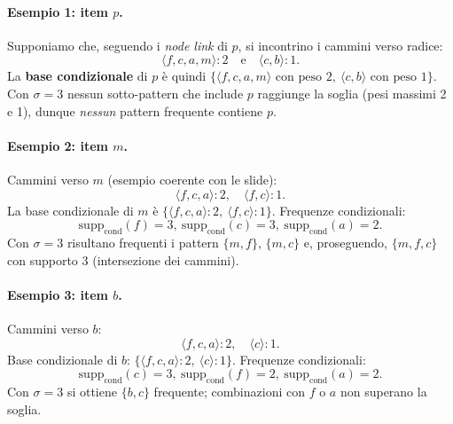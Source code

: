 \paragraph{Esempio 1: item $p$.}
Supponiamo che, seguendo i \emph{node link} di $p$, si incontrino i cammini verso radice:
\[
\langle f,c,a,m\rangle:2 \quad \text{e} \quad \langle c,b\rangle:1.
\]
La \textbf{base condizionale} di $p$ \`e quindi $\{\langle f,c,a,m\rangle \text{ con peso } 2,\ \langle c,b\rangle \text{ con peso } 1\}$. Con $\sigma=3$ nessun sotto-pattern che include $p$ raggiunge la soglia (pesi massimi 2 e 1), dunque \emph{nessun} pattern frequente contiene $p$.

\paragraph{Esempio 2: item $m$.}
Cammini verso $m$ (esempio coerente con le slide):
\[
\langle f,c,a\rangle:2,\quad \langle f,c\rangle:1.
\]
La base condizionale di $m$ \`e $\{\langle f,c,a\rangle:2,\ \langle f,c\rangle:1\}$. Frequenze condizionali:
\[
\mathrm{supp}_{\mathrm{cond}}(f)=3,\ \mathrm{supp}_{\mathrm{cond}}(c)=3,\ \mathrm{supp}_{\mathrm{cond}}(a)=2.
\]
Con $\sigma=3$ risultano frequenti i pattern $\{m,f\}$, $\{m,c\}$ e, proseguendo, $\{m,f,c\}$ con supporto $3$ (intersezione dei cammini). 

\paragraph{Esempio 3: item $b$.}
Cammini verso $b$:
\[
\langle f,c,a\rangle:2,\quad \langle c\rangle:1.
\]
Base condizionale di $b$: $\{\langle f,c,a\rangle:2,\ \langle c\rangle:1\}$. Frequenze condizionali:
\[
\mathrm{supp}_{\mathrm{cond}}(c)=3,\ \mathrm{supp}_{\mathrm{cond}}(f)=2,\ \mathrm{supp}_{\mathrm{cond}}(a)=2.
\]
Con $\sigma=3$ si ottiene $\{b,c\}$ frequente; combinazioni con $f$ o $a$ non superano la soglia.

